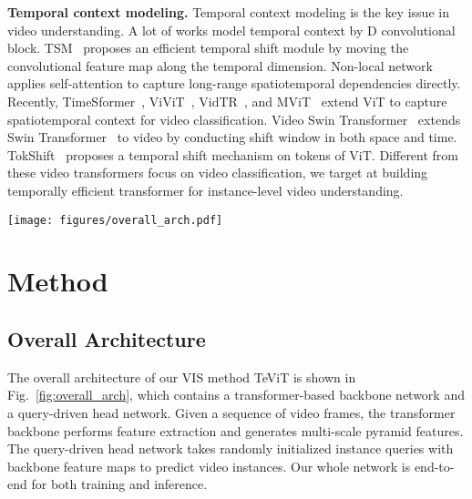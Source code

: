 \documentclass[10pt,twocolumn,letterpaper]{article}
\begin{document}
\noindent\textbf{Temporal context modeling.}
Temporal context modeling is the key issue in video understanding. A lot of works \cite{c3d, i3d, p3d, s3d, r213d} model temporal context by D convolutional block. TSM~\cite{tsm} proposes an efficient temporal shift module by moving the convolutional feature map along the temporal dimension. Non-local network~\cite{nonlocal} applies self-attention to capture long-range spatiotemporal dependencies directly. Recently, TimeSformer~\cite{timesformer}, ViViT~\cite{vivit}, VidTR~\cite{vidtr}, and MViT~\cite{mvit} extend ViT to capture spatiotemporal context for video classification. Video Swin Transformer~\cite{videoswin} extends Swin Transformer~\cite{swintransformer} to video by conducting shift window  in both space and time. TokShift~\cite{tokshift} proposes a temporal shift mechanism on  tokens of ViT. Different from these video transformers focus on video classification, we target at building temporally efficient transformer for instance-level video understanding.


\begin{figure*}
    \centering
    \texttt{[image: figures/overall\_arch.pdf]}
    \caption{The overall illustration of our TeViT framework. TeViT contains a messenger shift transformer backbone and a series of spatiotemporal query-driven instance heads. The messenger shift mechanism performs efficient frame-level temporal modeling by simply shifting messenger tokens along the temporal axis. Spatiotemporal query interaction conducts two successive and parameter-shared multi-head self attention () with feed forward network () upon video instance queries. The ``Dynamic Conv" design follows QueryInst~\cite{queryinst}. Best viewed in color.}
    \label{fig:overall_arch}
\end{figure*}

\section{Method}

\subsection{Overall Architecture}

The overall architecture of our VIS method TeViT is shown in Fig.~\ref{fig:overall_arch}, which contains a transformer-based backbone network and a query-driven head network. Given a sequence of video frames, the transformer backbone performs feature extraction and generates multi-scale pyramid features. The query-driven head network takes randomly initialized instance queries with backbone feature maps to predict video instances. Our whole network is end-to-end for both training and inference.
\end{document}
